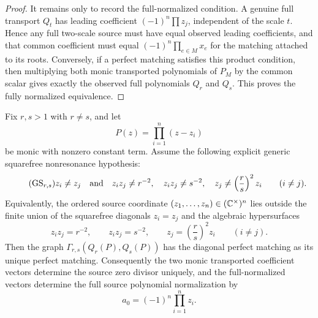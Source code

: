 \begin{proof}
It remains only to record the full-normalized condition.  A genuine
full transport \(Q_t\) has leading coefficient
\((-1)^n\prod z_j\), independent of the scale \(t\).  Hence any full
two-scale source must have equal observed leading coefficients, and
that common coefficient must equal
\((-1)^n\prod_{e\in M}x_e\) for the matching attached to its roots.
Conversely, if a perfect matching satisfies this product condition,
then multiplying both monic transported polynomials of \(P_M\) by the
common scalar gives exactly the observed full polynomials \(Q_r\) and
\(Q_s\).  This proves the fully normalized equivalence.
\end{proof}

\begin{corollary}\label{cor:generic-two-scale-injectivity}
Fix \(r,s>1\) with \(r\ne s\), and let
\[
P(z)=\prod_{i=1}^{n}(z-z_i)
\]
be monic with nonzero constant term.  Assume the following explicit
generic squarefree nonresonance hypothesis:
\[
\tag{\(\mathrm{GS}_{r,s}\)}
z_i\ne z_j
\quad\text{and}\quad
z_i z_j\ne r^{-2},\quad
z_i z_j\ne s^{-2},\quad
z_j\ne \left(\frac r s\right)^2 z_i
\qquad (i\ne j).
\]
Equivalently, the ordered source coordinate
\((z_1,\dots,z_n)\in(\mathbb{C}^\times)^n\) lies outside the finite union of
the squarefree diagonals \(z_i=z_j\) and the algebraic hypersurfaces
\[
z_i z_j=r^{-2},
\qquad
z_i z_j=s^{-2},
\qquad
z_j=\left(\frac r s\right)^2 z_i
\qquad (i\ne j).
\]
Then the graph
\(\Gamma_{r,s}(Q_r(P),Q_s(P))\) has the diagonal perfect matching as
its unique perfect matching.  Consequently the two monic transported
coefficient vectors determine the source zero divisor uniquely, and
the full-normalized vectors determine the full source polynomial
normalization by
\[
a_0=(-1)^n\prod_{i=1}^{n}z_i .
\]
\end{corollary}

